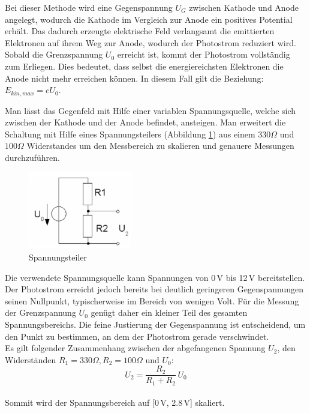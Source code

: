 Bei dieser Methode wird eine Gegenspannung $U_G$ zwischen Kathode und Anode angelegt, wodurch die Kathode im Vergleich zur Anode ein positives Potential erhält.
Das dadurch erzeugte elektrische Feld verlangsamt die emittierten Elektronen auf ihrem Weg zur Anode, wodurch der Photostrom reduziert wird. Sobald die Grenzspannung $U_0$ erreicht ist, kommt der Photostrom vollständig zum Erliegen. 
Dies bedeutet, dass selbst die energiereichsten Elektronen die Anode nicht mehr erreichen können. In diesem Fall gilt die Beziehung: 
$E_{kin,max} = eU_0$.

Man lässt das Gegenfeld mit Hilfe einer variablen Spannungsquelle, welche sich zwischen der Kathode und der Anode befindet, ansteigen.
Man erweitert die Schaltung mit Hilfe eines Spannungsteilers (Abbildung \ref{fig:spannungsteiler}) aus einem $330\Omega$ und $100\Omega$ Widerstandes um den Messbereich zu skalieren und genauere Messungen durchzuführen.
\begin{figure}[htbp]
    \centering
    \includegraphics[width=0.4\textwidth]{figs/Spannungsteiler.png}
    \caption{ Spannungsteiler \cite{Spannungsteiler}}
    \label{fig:spannungsteiler}
\end{figure}
\FloatBarrier
Die verwendete Spannungsquelle kann Spannungen von 0\,V bis 12\,V bereitstellen. 
Der Photostrom erreicht jedoch bereits bei deutlich geringeren Gegenspannungen seinen Nullpunkt, typischerweise im Bereich von wenigen Volt. 
Für die Messung der Grenzspannung $U_0$ genügt daher ein kleiner Teil des gesamten Spannungsbereichs. 
Die feine Justierung der Gegenspannung ist entscheidend, um den Punkt zu bestimmen, an dem der Photostrom gerade verschwindet.\\
Es gilt folgender Zusammenhang zwischen der abgefangenen Spannung $U_2$, den Widerständen $R_1 = 330 \Omega, R_2 = 100 \Omega$ und $U_0$:
\begin{equation}
  U_2 = \frac{R_2}{R_1 + R_2}\,U_0
\end{equation}\\
Sommit wird der Spannungsbereich auf [0\,V, 2.8\,V] skaliert.\\

